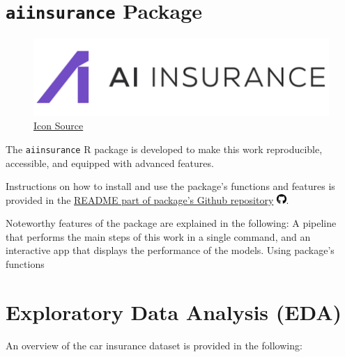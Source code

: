 \documentclass{article}
\begin{document}
\hypertarget{aiinsurance-package}{%
\section{\texorpdfstring{\texttt{aiinsurance} Package
\label{sec:package}}{aiinsurance Package }}\label{aiinsurance-package}}

\begin{figure}
\includegraphics[width=0.9\linewidth]{"./figures/logo.png"}
\captionsetup{justification=raggedright,singlelinecheck=false}
\caption*{ \tiny \href{https://aiinsurance.io/}{Icon Source}}
\end{figure}

The \texttt{aiinsurance} R package \cite{package} is developed to make
this work reproducible, accessible, and equipped with advanced features.

Instructions on how to install and use the package's functions and
features is provided in the
\href{https://github.com/berserkhmdvhb/aiinsurance\#readme}{README part
of package's Github repository}
\includegraphics[width=0.97em,height=1em]{report_files/figure-latex/fa-icon-9e25601f72c0b4fff1c079a486ca8bba.pdf}.

Noteworthy features of the package are explained in the following: A
pipeline that performs the main steps of this work in a single command,
and an interactive app that displays the performance of the models.
Using package's functions

\hypertarget{exploratory-data-analysis-eda}{%
\section{\texorpdfstring{Exploratory Data Analysis (EDA)
\label{sec:data}}{Exploratory Data Analysis (EDA) }}\label{exploratory-data-analysis-eda}}

An overview of the car insurance dataset is provided in the following:
\scriptsize
\end{document}
